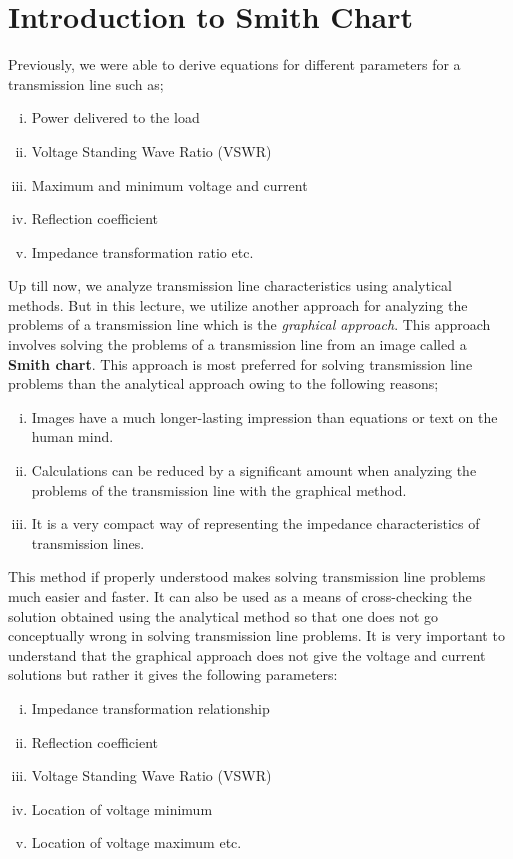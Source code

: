 \section{Introduction to Smith Chart}\label{lec:lec7}
Previously, we were able to derive equations for different parameters for a transmission line such as;
\begin{enumerate}[(i)]
\item 	Power delivered to the load
\item	Voltage Standing Wave Ratio (VSWR)
\item	Maximum and minimum voltage and current
\item	Reflection coefficient
\item	Impedance transformation ratio etc.
\end{enumerate}

Up till now, we analyze transmission line characteristics using analytical methods. But in this lecture, we utilize another approach for analyzing the problems of a transmission line which is the \emph{graphical approach}. This approach involves solving the problems of a transmission line from an image called a \textbf{Smith chart}. This approach is most preferred for solving transmission line problems than the analytical approach owing to the following reasons;
\begin{enumerate}[(i)]
\item Images have a much longer-lasting impression than equations or text on the human mind.
\item Calculations can be reduced by a significant amount when analyzing the problems of the transmission line with the graphical method.
\item It is a very compact way of representing the impedance characteristics of transmission lines.
\end{enumerate}

This method if properly understood makes solving transmission line problems much easier and faster. It can also be used as a means of cross-checking the solution obtained using the analytical method so that one does not go conceptually wrong in solving transmission line problems.
It is very important to understand that the graphical approach does not give the voltage and current solutions but rather it gives the following parameters:
\begin{enumerate}[(i)]
\item Impedance transformation relationship 
\item Reflection coefficient
\item Voltage Standing Wave Ratio (VSWR)
\item Location of voltage minimum
\item Location of voltage maximum etc.
\end{enumerate}

